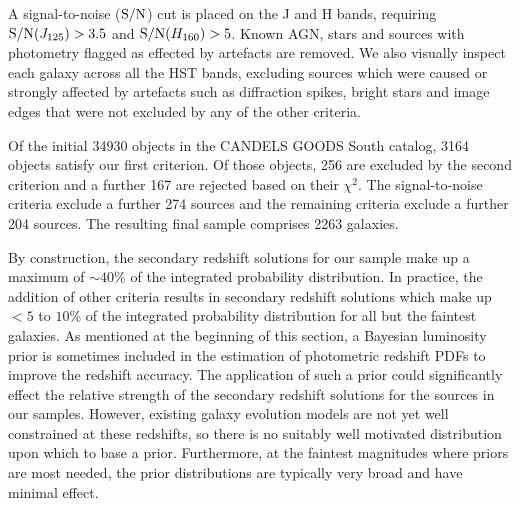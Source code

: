 A signal-to-noise ($\textup{S/N}$) cut is placed on the J and H bands, requiring $\textup{S/N}(J_{125}) > 3.5$ and $\textup{S/N}(H_{160}) > 5$. Known AGN, stars and sources with photometry flagged as effected by artefacts are removed. We also visually inspect each galaxy across all the HST bands, excluding sources which were caused or strongly affected by artefacts such as diffraction spikes, bright stars and image edges that were not excluded by any of the other criteria. 

Of the initial 34930 objects in the CANDELS GOODS South catalog, 3164 objects satisfy our first criterion. Of those objects, 256 are excluded by the second criterion and a further 167 are rejected based on their $\chi^{2}$. The signal-to-noise criteria exclude a further 274 sources and the remaining criteria exclude a further 204 sources. The resulting final sample comprises 2263 galaxies.

By construction, the secondary redshift solutions for our sample make up a maximum of $\sim40\%$ of the integrated probability distribution. In practice, the addition of other criteria results in secondary redshift solutions which make up $<5$ to $10\%$ of the integrated probability distribution for all but the faintest galaxies. As mentioned at the beginning of this section, a Bayesian luminosity prior is sometimes included in the estimation of photometric redshift PDFs to improve the redshift accuracy. The application of such a prior could significantly effect the relative strength of the secondary redshift solutions for the sources in our samples. However, existing galaxy evolution models are not yet well constrained at these redshifts, so there is no suitably well motivated distribution upon which to base a prior. Furthermore, at the faintest magnitudes where priors are most needed, the prior distributions are typically very broad \citep{Brammer:2008gn} and have minimal effect.

